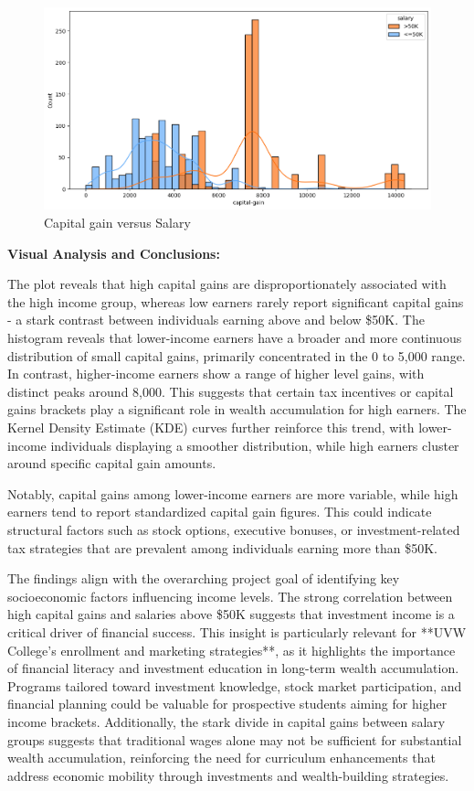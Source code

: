 \documentclass[journal,onecolumn]{IEEEtran}
\begin{document}
\begin{figure}[h]
    \centering
    \includegraphics[width=1\linewidth]{capital-gain.png}  %
    \caption{Capital gain versus Salary}
    \label{fig:Capital gain - Salary}
\end{figure}

\textbf{Visual Analysis and Conclusions:} 

The plot reveals that high capital gains are disproportionately associated
with the high income group, whereas low earners rarely report significant
capital gains - a stark contrast between individuals earning above and below \$50K.
The histogram reveals that lower-income earners have a broader and
more continuous distribution of small capital gains, primarily
concentrated in the 0 to 5,000 range. In contrast, higher-income
earners show a range of higher level gains, with distinct peaks
around 8,000. This suggests that certain tax
incentives or capital gains brackets play a significant
role in wealth accumulation for high earners. The Kernel Density
Estimate (KDE) curves further reinforce this trend, with
lower-income individuals displaying a smoother distribution,
while high earners cluster around specific capital gain amounts. 

Notably, capital gains among lower-income earners are more variable,
while high earners tend to report standardized capital gain figures.
This could indicate structural factors such as stock options, executive bonuses,
or investment-related tax strategies that are prevalent among individuals earning more than \$50K.

The findings align with the overarching project goal of identifying key
socioeconomic factors influencing income levels. The strong correlation
between high capital gains and salaries above \$50K suggests that
investment income is a critical driver of financial success.
This insight is particularly relevant for **UVW College’s enrollment
and marketing strategies**, as it highlights the importance of
financial literacy and investment education in long-term wealth accumulation.
Programs tailored toward investment knowledge, stock market participation,
and financial planning could be valuable for prospective students aiming
for higher income brackets. Additionally, the stark divide in capital gains
between salary groups suggests that traditional wages alone may not be
sufficient for substantial wealth accumulation, reinforcing the need for
curriculum enhancements that address economic mobility through investments
and wealth-building strategies.
\end{document}
